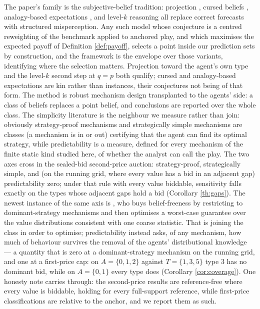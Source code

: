 \documentclass[12pt]{article}
\theoremstyle{definition}
\begin{document}
The paper's family is the subjective-belief tradition: projection \citep{gpr2021projection}, cursed beliefs \citep{eyster2005cursed}, analogy-based expectations \citep{jehiel2005analogy}, and level-$k$ reasoning \citep{crawford2007levelk} all replace correct forecasts with structured misperception. Any such model whose conjecture is a centred reweighting of the benchmark applied to anchored play, and which maximises the expected payoff of Definition \ref{def:payoff}, selects a point inside our prediction sets by construction, and the framework is the envelope over those variants, identifying where the selection matters. Projection toward the agent's own type and the level-$k$ second step at $q = p$ both qualify; cursed and analogy-based expectations are kin rather than instances, their conjectures not being of that form. The method is robust mechanism design transplanted to the agents' side: a class of beliefs replaces a point belief, and conclusions are reported over the whole class. The simplicity literature is the neighbour we measure rather than join: obviously strategy-proof mechanisms \citep{li2017osp} and strategically simple mechanisms \citep{borgersli2019strategically} are classes (a mechanism is in or out) certifying that the agent can find its optimal strategy, while predictability is a measure, defined for every mechanism of the finite static kind studied here, of whether the analyst can call the play. The two axes cross in the sealed-bid second-price auction: strategy-proof, strategically simple, and (on the running grid, where every value has a bid in an adjacent gap) predictability zero; under that rule with every value biddable, sensitivity falls exactly on the types whose adjacent gaps hold a bid (Corollary \ref{th:gaps}). The newest instance of the same axis is \citet{zhang2026gda}, who buys belief-freeness by restricting to dominant-strategy mechanisms and then optimises a worst-case guarantee over the value distributions consistent with one coarse statistic. That is joining the class in order to optimise; predictability instead asks, of any mechanism, how much of behaviour survives the removal of the agents' distributional knowledge --- a quantity that is zero at a dominant-strategy mechanism on the running grid, and one at a first-price cap: on $A = \{0,1,2\}$ against $T = \{1,3,5\}$ type 3 has no dominant bid, while on $A = \{0,1\}$ every type does (Corollary \ref{cor:coverage}). One honesty note carries through: the second-price results are reference-free where every value is biddable, holding for every full-support reference, while first-price classifications are relative to the anchor, and we report them as such.
\end{document}
